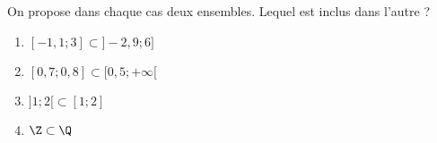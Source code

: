 
On propose dans chaque cas deux ensembles. Lequel est inclus dans l'autre ?  

\begin{enumerate}
\item $[-1,1;3] \subset ]-2,9;6]$
\item $[0,7;0,8] \subset [0,5;+\infty[$
\item $]1;2[ \subset [1;2]$
\item  $\Z \subset \Q$
\end{enumerate}